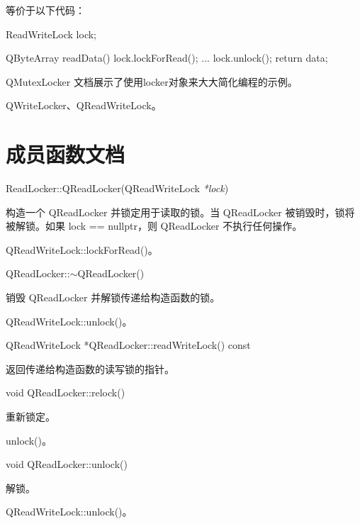 等价于以下代码：

\begin{cppcode}
ReadWriteLock lock;

QByteArray readData()
{
    lock.lockForRead();
    ...
    lock.unlock();
    return data;
}
\end{cppcode}

QMutexLocker 文档展示了使用locker对象来大大简化编程的示例。

\begin{seeAlso}
QWriteLocker、QReadWriteLock。
\end{seeAlso}

\section{成员函数文档}

ReadLocker::QReadLocker(QReadWriteLock \emph{*lock})

构造一个 QReadLocker 并锁定用于读取的锁。当 QReadLocker 被销毁时，锁将被解锁。如果 lock == nullptr，则 QReadLocker 不执行任何操作。


\begin{seeAlso}
QReadWriteLock::lockForRead()。
\end{seeAlso}

QReadLocker::$\sim$QReadLocker()

销毁 QReadLocker 并解锁传递给构造函数的锁。

\begin{seeAlso}
QReadWriteLock::unlock()。
\end{seeAlso}

QReadWriteLock *QReadLocker::readWriteLock() const

返回传递给构造函数的读写锁的指针。

void QReadLocker::relock()

重新锁定。

\begin{seeAlso}
unlock()。
\end{seeAlso}

void QReadLocker::unlock()

解锁。

\begin{seeAlso}
QReadWriteLock::unlock()。
\end{seeAlso}